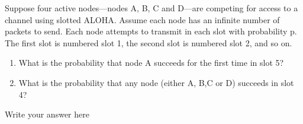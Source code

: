 \documentclass{report}
\begin{document}
\newpage



\begin{problem}
Suppose four active nodes—nodes A, B, C and D—are competing for access to a channel using slotted ALOHA. Assume each node has an infinite number of packets to send. Each node attempts to transmit in each slot with probability p. The first slot is numbered slot 1, the second slot is numbered slot 2, and so on.

\begin{enumerate}
\item What is the probability that node A succeeds for the first time in slot 5?
\item What is the probability that any node (either A, B,C or D) succeeds in slot 4?
\end{enumerate}

\begin{answer}{45em}
Write your answer here
\end{answer}
\end{problem}


\newpage
\end{document}
